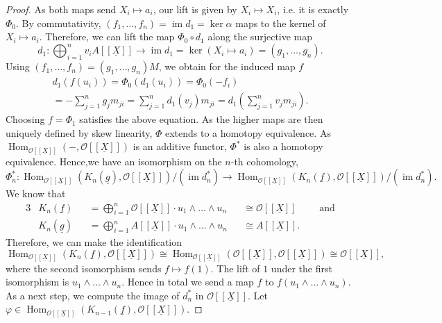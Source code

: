 \documentclass{article}
\theoremstyle{plain}%
\theoremstyle{definition}
\theoremstyle{remark}
\newcommand{\im}{\operatorname{im}}
\renewcommand{\hom}{\operatorname{Hom}}
\begin{document}
\begin{proof}
    As both maps send \(X_i \mapsto a_i\), our lift is given by \(X_i \mapsto X_i\), i.e. it is exactly \(\Phi_0\).
    By commutativity, \((f_1, \dots, f_n) = \im d_1 = \ker \alpha\) maps to the kernel of \(X_i \mapsto a_i\). Therefore, we can lift the map
    \(\Phi_0 \circ d_1\) along the surjective map 
    \[
        d_1 \colon \bigoplus_{i=1}^n v_i A[[\underline{X}]] \to \im d_1 = \ker(X_i \mapsto a_i) = (g_1, \dots, g_n).
    \]
    Using \((f_1, \dots, f_n) = (g_1, \dots, g_n)M\), we obtain for the induced map \(f\)
    \begin{multline*}
        d_1(f(u_i)) = \Phi_0(d_1(u_i)) = \Phi_0(-f_i)\\ = - \sum_{j=1}^n g_jm_{ji}
        = \sum_{j=1}^n d_1(v_j)m_{ji} = d_1\left(\sum_{j=1}^n v_j m_{ji}\right).
    \end{multline*}
    Choosing \(f = \Phi_1\) satisfies the above equation.
    As the higher maps are then uniquely defined by skew linearity,  \(\Phi\) extends to a homotopy equivalence.
    As \(\hom_{\mathcal{O}[[\underline{X}]]}(-, \mathcal{O}[[\underline{X}]])\) is an additive functor, 
    \(\Phi^*\) is also a homotopy equivalence. Hence,we have an isomorphism on the \(n\)-th cohomology,
    \[
        \Phi_n^*\colon \hom_{\mathcal{O}[[\underline{X}]]}(K_n(\underline{g}), \mathcal{O}[[\underline{X}]])/(\im d_n^*)
        \to \hom_{\mathcal{O}[[\underline{X}]]}(K_n(\underline{f}), \mathcal{O}[[\underline{X}]])/(\im d_n^*).
    \]
    We know that 
    \begin{alignat*}{3}
        &K_n(\underline{f}) &&= \bigoplus_{i = 1}^n \mathcal{O}[[\underline{X}]] \cdot u_1\wedge\dots\wedge u_n
        &&\cong \mathcal{O}[[\underline{X}]]\qquad\text{ and}\\
        &K_n(\underline{g}) &&= \bigoplus_{i = 1}^n A[[\underline{X}]] \cdot u_1\wedge\dots\wedge u_n 
        &&\cong A[[\underline{X}]]. 
    \end{alignat*}
    Therefore, we can make the identification
    \[
        \hom_{\mathcal{O}[[\underline{X}]]}(K_n(\underline{f}), \mathcal{O}[[\underline{X}]])
        \cong \hom_{\mathcal{O}[[\underline{X}]]}(\mathcal{O}[[\underline{X}]], \mathcal{O}[[\underline{X}]])
        \cong \mathcal{O}[[\underline{X}]],
    \]
    where the second isomorphism sends \(f \mapsto f(1)\). The lift of \(1\) under the first isomorphism is 
    \(u_1\wedge\dots\wedge u_n\). Hence in total we send a map 
    \(f\) to \(f(u_1\wedge\dots\wedge u_n)\).
    As a next step, we compute the image of \(d_n^*\) in \(\mathcal{O}[[\underline{X}]]\).
    Let \(\varphi \in \hom_{\mathcal{O}[[\underline{X}]]}(K_{n-1}(\underline{f}), \mathcal{O}[[\underline{X}]])\).

\end{proof}
\end{document}
